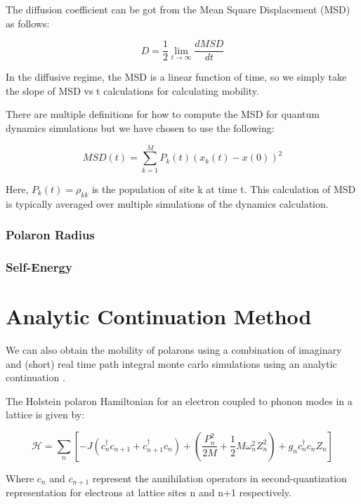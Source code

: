 The diffusion coefficient can be got from the Mean Square Displacement (MSD) as follows: 

\begin{equation}
D = \frac{1}{2} \lim_{t \to \infty} \frac{dMSD}{dt}
\end{equation}

In the diffusive regime, the MSD is a linear function of time, so we simply take the slope of MSD vs t calculations for calculating mobility.

There are multiple definitions for how to compute the MSD for quantum dynamics simulations but we have chosen to use the following:

\begin{equation}
    MSD(t) = \sum_{k=1}^{M} P_{k}(t) (x_{k}(t) - x(0))^2
\end{equation}

Here, $P_k(t) = \rho_{kk}$ is the population of site k at time t. This calculation of MSD is typically averaged over multiple simulations of the dynamics calculation.

\subsubsection{Polaron Radius}

\subsubsection{Self-Energy}

\section{Analytic Continuation Method}

We can also obtain the mobility of polarons using a combination of imaginary and (short) real time path integral monte carlo simulations using an analytic continuation \cite{miladic2023method}. 

 The Holstein polaron Hamiltonian for an electron coupled to phonon modes in a lattice is given by:

 \begin{equation}
    \mathcal{H} = \sum_n [-J(c_n^{\dag} c_{n+1} + c_{n+1}^{\dag}c_{n}) + (\frac{P_n^{2}}{2M} + \frac{1}{2}M\omega_n^{2} Z_{n}^{2}) + g_n c_n^{\dag}c_n Z_n]
 \end{equation}

 Where $c_n$ and $c_{n+1}$ represent the annihilation operators in second-quantization representation for electrons at lattice sites n and n+1 respectively.

